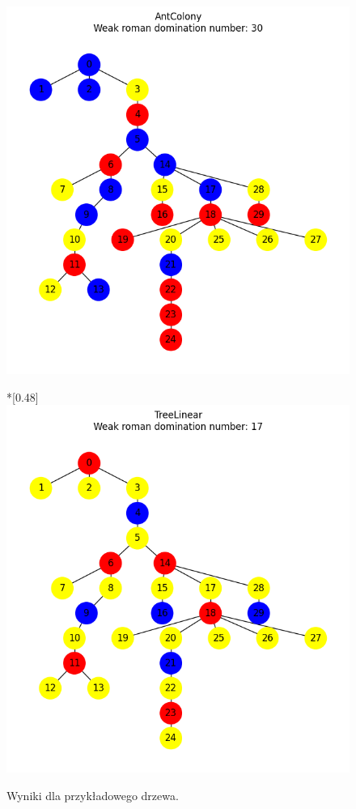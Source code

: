 \begin{figure}[H]
\begin{subcaptionbox}
            {\includegraphics[width=0.75\linewidth]{assets/plots/AntColony/RandomTree_n30_i2_results.png}}
        \end{subcaptionbox}
        \hfill
        \begin{subcaptionbox}*{}[0.48\linewidth]
            {\includegraphics[width=0.75\linewidth]{assets/plots/TreeLinear/RandomTree_n30_i2_results.png}}
        \end{subcaptionbox}
    
        \caption{Wyniki dla przykładowego drzewa.}
        \label{fig:tree}
    \end{figure}


